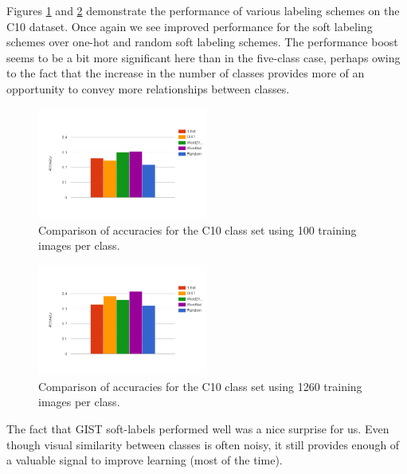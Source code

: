 Figures \ref{fig:10_1-train_100} and \ref{fig:10_1-train_1260} demonstrate the
performance of various labeling schemes on the C10 dataset. Once again we see
improved performance for the soft labeling schemes over one-hot and random soft
labeling schemes. The performance boost seems to be a bit more significant here
than in the five-class case, perhaps owing to the fact that the increase in the
number of classes provides more of an opportunity to convey more relationships
between classes.

\begin{figure}[!tb]
  \centering
  \includegraphics[width=0.5\textwidth]{figs/10_1-train_100.png}
  \caption{
      Comparison of accuracies for the C10 class set using 100 training images
      per class.
  }
  \label{fig:10_1-train_100}
\end{figure}

\begin{figure}[!tb]
  \centering
  \includegraphics[width=0.5\textwidth]{figs/10_1-train_1260.png}
  \caption{
      Comparison of accuracies for the C10 class set using 1260 training images
      per class.
  }
  \label{fig:10_1-train_1260}
\end{figure}

The fact that GIST soft-labels performed well was a nice surprise for us. Even
though visual similarity between classes is often noisy, it still provides
enough of a valuable signal to improve learning (most of the time).


